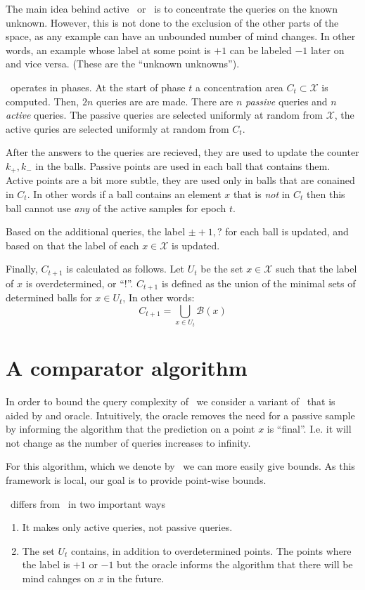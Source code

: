 \documentclass{article}
\def\X{{\mathcal X}}
\def\B{{\mathcal B}}
\begin{document}
The main idea behind active \NNB\, or \ANNB\, is to concentrate the
queries on the known unknown. However, this is not done to the
exclusion of the other parts of the space, as any example can have an
unbounded number of mind changes. In other words, an example whose label at some point is $+1$
can be labeled $-1$ later on and vice versa. (These are the ``unknown
unknowns'').

\ANNB\ operates in phases. At the start of phase $t$ a concentration
area $C_t \subset \X$ is computed. Then, $2n$ queries are are
made. There are $n$ {\em passive} queries and $n$ {\em active} queries.
The passive queries are selected uniformly at random from $\X$, the
active quries are selected uniformly at random from $C_t$.

After the answers to the queries are recieved, they are used to update
the counter $k_+,k_-$ in the balls. Passive points are used in each
ball that contains them. Active points are a bit more subtle, they are
used only in balls that are conained in $C_t$. In other words if a
ball contains an element $x$ that is {\em not} in $C_t$ then this ball
cannot use {\em any} of the active samples for epoch $t$.

Based on the additional queries, the label $\pm +1,?$ for each ball is
updated, and based on that the label of each $x \in \X$ is updated.

Finally, $C_{t+1}$ is calculated as follows. Let $U_t$ be the set $x
\in \X$ such that the label of $x$ is overdetermined, or ``!''.  $C_{t+1}$
is defined as the union of the minimal sets of determined balls for $x
\in U_t$, In other words:
\[
  C_{t+1} = \bigcup_{x \in U_t} \B(x)
  \]

  \section{A comparator algorithm}
  In order to bound the query complexity of \ANNB\ we consider a
  variant of \ANNB\ that is aided by and oracle. Intuitively, the
  oracle removes the need for a passive sample by informing the
  algorithm that the prediction on a point $x$ is ``final''. I.e. it
  will not change as the number of queries increases to infinity.

  For this algorithm, which we denote by \ONNB\, we can more easily
  give bounds. As this framework is local, our goal is to provide
  point-wise bounds.

  \ONNB\ differs from \ANNB\ in two important ways
  \begin{enumerate}
  \item It makes only active queries, not passive queries.
  \item The set $U_t$ contains, in addition to overdetermined
    points. The points where the label is $+1$ or $-1$ but the oracle
    informs the algorithm that there will be mind cahnges on $x$ in
    the future. 
  \end{enumerate}
\end{document}
